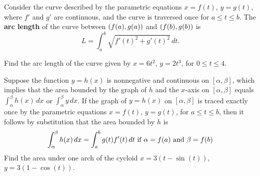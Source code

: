 \documentclass[../mathNotesPreamble]{subfiles}
\begin{document}
  \begin{defn*}
    Consider the curve described by the parametric equations $x=f(t)$, $y=g(t)$, where $f'$ and $g'$ are continuous, and the curve is traversed once for $a\leq t\leq b$. The \textbf{arc length} of the curve between ${\left(f(a),g(a)\right)}$ and ${\left(f(b),g(b)\right)}$ is
      \[L=\int_a^b \sqrt{f'(t)^2+g'(t)^2}\,dt.\]
  \end{defn*}

  \begin{ex*}[\textcolor{blue}{LC 33.1-33.2}]
    Find the arc length of the curve given by $x=6t^2$, $y=2t^3$, for $0\leq t\leq 4$.
  \end{ex*}
  \pagebreak

  \begin{ex*}
    Suppose the function $y=h(x)$ is nonnegative and continuous on $[\alpha,\beta]$, which implies that the area bounded by the graph of $h$ and the $x$-axis on $[\alpha,\beta]$ equals $\int_\alpha^\beta h(x)\,dx$ or $\int_\alpha^\beta y\,dx$. If the graph of $y=h(x)$ on $[\alpha,\beta]$ is traced exactly once by the parametric equations $x=f(t)$, $y=g(t)$, for $a\leq t\leq b$, then it follows by substitution that the area bounded by $h$ is
      \[\int_\alpha^\beta h(x)\,dx=\int_a^b g(t)f'(t)\,dt \textnormal{ if }\alpha=f(a) \textnormal{ and } \beta=f(b)\]
    Find the area under one arch of the cycloid $x=3(t-\sin(t))$, $y=3(1-\cos(t))$.
  \end{ex*}
  \begin{center}
  \end{center}
  \pagebreak
  
\end{document}
